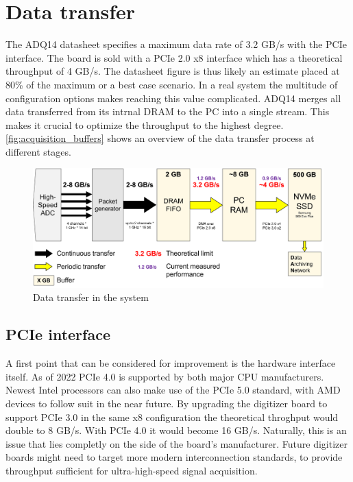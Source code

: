 \section{Data transfer} \label{sec:data_transfer}

The ADQ14 datasheet specifies a maximum data rate of 3.2 GB/s 
with the PCIe interface. The board is sold with a PCIe 2.0 x8 
interface which has a theoretical throughput of 4 GB/s.
The datasheet figure is thus likely an estimate placed at 80\% of 
the maximum or a best case scenario. In a real system 
the multitude of configuration options makes reaching this value
complicated. ADQ14 merges all data transferred from its intrnal DRAM 
to the PC into a single stream. This makes it crucial to
optimize the throughput to the highest degree.
\autoref{fig:acquisition_buffers} shows an overview
of the data transfer process at different stages.

\begin{figure}[H]
  \centering
  \includegraphics[width=\linewidth]{media/acquisition_buffers.png}
  \caption{Data transfer in the system}
  \label{fig:acquisition_buffers} 
\end{figure}

\subsection{PCIe interface}

A first point that can be considered for improvement is the hardware interface itself.
As of 2022 PCIe 4.0 is supported by both major CPU manufacturers. Newest Intel processors
can also make use of the PCIe 5.0 standard, with AMD devices to follow suit in the near future.
By upgrading the digitizer board to support PCIe 3.0 in the same x8 configuration the
theoretical throghput would double to 8 GB/s. With PCIe 4.0 it would become 16 GB/s.
Naturally, this is an issue that lies completly on the side of the board's manufacturer.
Future digitizer boards might need to target more modern interconnection standards,
to provide throughput sufficient for ultra-high-speed signal acquisition.

